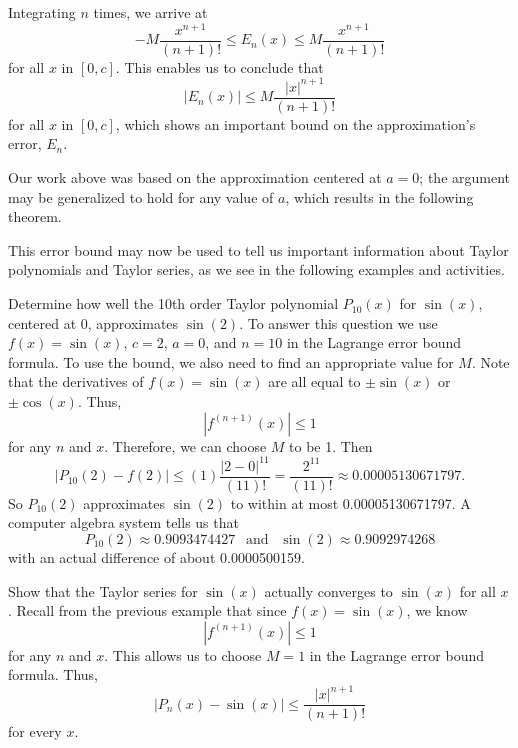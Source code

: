 Integrating $n$ times, we arrive at
\[-M\frac{x^{n+1}}{(n+1)!} \leq E_n(x) \leq M\frac{x^{n+1}}{(n+1)!}\]
for all $x$ in $[0, c]$.  This enables us to conclude that
\[\left|E_n(x)\right| \leq M\frac{|x|^{n+1}}{(n+1)!}\]
for all $x$ in $[0, c]$, which shows an important bound on the approximation's error, $E_n$.  

Our work above was based on the approximation centered at $a = 0$; the argument may be generalized to hold for any value of $a$, which results in the following theorem.

\vspace*{5pt}
\nin {}
\vspace*{1pt}

This error bound may now be used to tell us important information about Taylor polynomials and Taylor series, as we see in the following examples and activities.

\bex \label{Ex:8.5.3}
Determine how well the 10th order Taylor polynomial $P_{10}(x)$ for $\sin(x)$, centered at 0, approximates $\sin(2)$.
\eex
To answer this question we use $f(x) = \sin(x)$,  $c = 2$, $a=0$, and $n = 10$ in the Lagrange error bound formula. To use the bound, we also need to find an appropriate value for $M$. Note that the derivatives of $f(x) = \sin(x)$ are all equal to $\pm \sin(x)$ or $\pm \cos(x)$. Thus,
\[\left| f^{(n+1)}(x) \right| \leq 1\]
for any $n$ and $x$. Therefore, we can choose $M$ to be 1. Then
\[\left|P_{10}(2) - f(2)\right| \leq (1)\frac{|2-0|^{11}}{(11)!} = \frac{2^{11}}{(11)!} \approx 0.00005130671797.\]
So $P_{10}(2)$ approximates $\sin(2)$ to within at most 0.00005130671797. A computer algebra system tells us that
\[P_{10}(2) \approx 0.9093474427 \ \ \text{ and } \ \ \sin(2) \approx 0.9092974268\]
with an actual difference of about 0.0000500159.
\afterex



\bex \label{Ex:8.5.4} Show that the Taylor series for $\sin(x)$ actually converges to $\sin(x)$ for all $x$.
\eex
Recall from the previous example that since $f(x) = \sin(x)$, we know
\[\left| f^{(n+1)}(x) \right| \leq 1\]
for any $n$ and $x$. This allows us to choose $M = 1$ in the Lagrange error bound formula. Thus,
\begin{equation} \label{E:ErrorIneqSine}
|P_n(x) - \sin(x)| \leq \frac{|x|^{n+1}}{(n+1)!}
\end{equation}
for every $x$.

